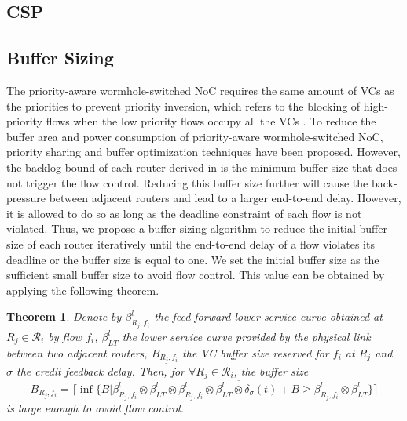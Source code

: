 \documentclass[preprint]{elsarticle}
\newtheorem{thm}{Theorem}
\begin{document}
\subsection{CSP}\label{e2elatency2}


\subsection{Buffer Sizing}\label{bufferopt}
The priority-aware wormhole-switched NoC \cite{Shi:2008:RCA:1397757.1397996}\cite{189}\cite{73} requires the same amount of VCs as the priorities to prevent priority inversion, which refers to the blocking of high-priority flows when the low priority flows occupy all the VCs \cite{707545}. To reduce the buffer area and power consumption of priority-aware wormhole-switched NoC, priority sharing \cite{5161497} and buffer optimization \cite{189} techniques have been proposed. However, the backlog bound of each router derived in \cite{189} is the minimum buffer size that does not trigger the flow control. Reducing this buffer size further will cause the back-pressure between adjacent routers and lead to a larger end-to-end delay. However, it is allowed to do so as long as the deadline constraint of each flow is not violated. Thus, we propose a buffer sizing algorithm to reduce the initial buffer size of each router iteratively until the end-to-end delay of a flow violates its deadline or the buffer size is equal to one. We set the initial buffer size as the sufficient small buffer size to avoid flow control. This value can be obtained by applying the following theorem.
\begin{thm}\label{initial}
Denote by $\beta_{R_j,f_i}^l$ the feed-forward lower service curve obtained at $R_j\in\mathcal{R}_i$ by flow $f_i$, $\beta_{LT}^l$ the lower service curve provided by the physical link between two adjacent routers, $B_{R_j,f_i}$ the VC buffer size reserved for $f_i$ at $R_j$ and $\sigma$ the credit feedback delay. Then, for $\forall R_j\in\mathcal{R}_i$, the buffer size $$B_{R_j,f_i}=\lceil\inf\{B|\beta_{R_j,f_i}^l\otimes\beta_{LT}^l\otimes\overline{\beta_{R_j,f_i}^l\otimes\beta_{LT}^l\otimes\delta_\sigma(t)+B}\geq\beta_{R_j,f_i}^l\otimes\beta_{LT}^l\}\rceil$$
is large enough to avoid flow control.
\end{thm}
\end{document}
